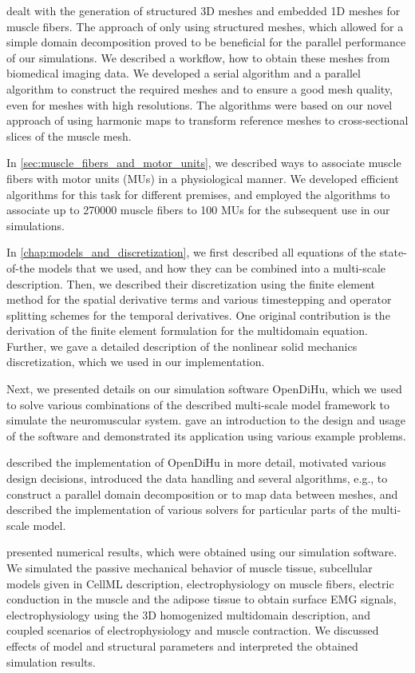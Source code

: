  dealt with the generation of structured 3D meshes and embedded 1D meshes for muscle fibers. The approach of only using structured meshes, which allowed for a simple domain decomposition proved to be beneficial for the parallel performance of our simulations.  
We described a workflow, how to obtain these meshes from biomedical imaging data. We developed a serial algorithm and a parallel algorithm to construct the required meshes and to ensure a good mesh quality, even for meshes with high resolutions. The algorithms were based on our novel approach of using harmonic maps to transform reference meshes to cross-sectional slices of the muscle mesh.

In \cref{sec:muscle_fibers_and_motor_units}, we described ways to associate muscle fibers with motor units (MUs) in a physiological manner. We developed efficient algorithms for this task for different premises, and employed the algorithms to associate up to \num{270000} muscle fibers to \num{100} MUs for the subsequent use in our simulations.

In \cref{chap:models_and_discretization}, we first described all equations of the state-of-the models that we used, and how they can be combined into a multi-scale description. Then, we described their discretization using the finite element method for the spatial derivative terms and various timestepping and operator splitting schemes for the temporal derivatives. One original contribution is the derivation of the finite element formulation for the multidomain equation. Further, we gave a detailed description of the nonlinear solid mechanics discretization, which we used in our implementation.

Next, we presented details on our simulation software OpenDiHu, which we used to solve various combinations of the described multi-scale model framework to simulate the neuromuscular system.  gave an introduction to the design and usage of the software and demonstrated its application using various example problems.

 described the implementation of OpenDiHu in more detail, motivated various design decisions, introduced the data handling and several algorithms, e.g., to construct a parallel domain decomposition or to map data between meshes, and described the implementation of various solvers for particular parts of the multi-scale model.

 presented numerical results, which were obtained using our simulation software. We simulated the passive mechanical behavior of muscle tissue, subcellular models given in CellML description, electrophysiology on muscle fibers, electric conduction in the muscle and the adipose tissue to obtain surface EMG signals, electrophysiology using the 3D homogenized multidomain description, and coupled scenarios of electrophysiology and muscle contraction. We discussed effects of model and structural parameters and interpreted the obtained simulation results.

